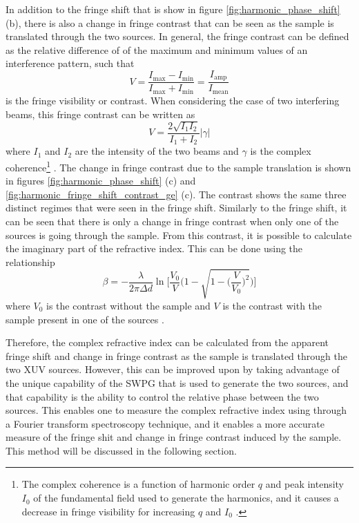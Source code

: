 In addition to the fringe shift that is show in figure \ref{fig:harmonic_phase_shift} (b), there is also a change in fringe contrast that can be seen as the sample is translated through the two sources.  In general, the fringe contrast can be defined as the relative difference of of the maximum and minimum values of an interference pattern, such that
\begin{equation}
	V=\frac{I_{\mathrm{max}} - I_{\mathrm{min}}}{I_{\mathrm{max}} + I_{\mathrm{min}}} = \frac{I_{\mathrm{amp}}}{I_{\mathrm{mean}}}
\end{equation}
is the fringe visibility or contrast.  When considering the case of two interfering beams, this fringe contrast can be written as
\begin{equation}
\label{eqn:fringe_visibility} 
	V = \frac{2\sqrt{I_1 I_2}}{I_1 + I_2}\rvert\gamma\lvert
\end{equation}
where $I_1$ and $I_2$ are the intensity of the two beams and $\gamma$ is the complex coherence\footnote{The complex coherence is a function of harmonic order $q$ and peak intensity $I_0$ of the fundamental field used to generate the harmonics, and it causes a decrease in fringe visibility for increasing $q$ and $I_0$ \cite{ditmireSpatialCoherenceMeasurement1996}.} \cite{hemmersMulticolorXUVInterferometry2009, ditmireSpatialCoherenceMeasurement1996, wilsonDoubleSlitInterferometry2012}.   
The change in fringe contrast due to the sample translation is shown in figures \ref{fig:harmonic_phase_shift} (c) and \ref{fig:harmonic_fringe_shift_contrast_ge} (c).  The contrast shows the same three distinct regimes that were seen in the fringe shift.  Similarly to the fringe shift, it can be seen that there is only a change in fringe contrast when only one of the sources is going through the sample.  From this contrast, it is possible to calculate the imaginary part of the refractive index.  This can be done using the relationship
\begin{equation}
\label{eqn:beta_fringe_contrast}
	\beta = -\frac{\lambda}{2\pi \Delta d} \ln\Bigg[\frac{V_0}{V}\Bigg(1-\sqrt{1-\bigg(\frac{V}{V_0}\bigg)^2}\Bigg)\Bigg]
\end{equation} 
where $V_0$ is the contrast without the sample and $V$ is the contrast with the sample present in one of the sources \cite{hemmersMulticolorXUVInterferometry2009}.

Therefore, the complex refractive index can be calculated from the apparent fringe shift and change in fringe contrast as the sample is translated through the two XUV sources.  However, this can be improved upon by taking advantage of the unique capability of the SWPG that is used to generate the two sources, and that capability is the ability to control the relative phase between the two sources.  This enables one to measure the complex refractive index using through a Fourier transform spectroscopy technique, and it enables a more accurate measure of the fringe shit and change in fringe contrast induced by the sample.  This method will be discussed in the following section.

